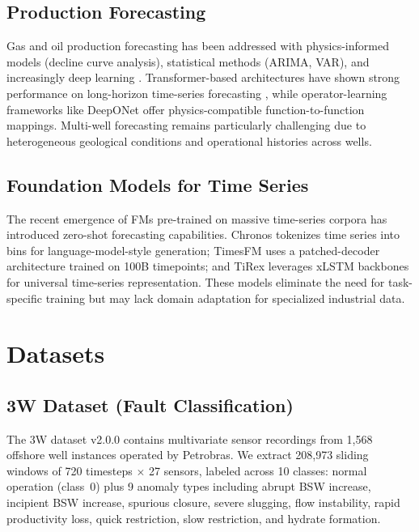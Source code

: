\documentclass[conference]{IEEEtran}
\begin{document}
\subsection{Production Forecasting}

Gas and oil production forecasting has been addressed with physics-informed models (decline curve analysis), statistical methods (ARIMA, VAR), and increasingly deep learning \cite{dl_forecasting}. Transformer-based architectures have shown strong performance on long-horizon time-series forecasting \cite{patchtst}, while operator-learning frameworks like DeepONet \cite{deeponet} offer physics-compatible function-to-function mappings. Multi-well forecasting remains particularly challenging due to heterogeneous geological conditions and operational histories across wells.

\subsection{Foundation Models for Time Series}

The recent emergence of FMs pre-trained on massive time-series corpora has introduced zero-shot forecasting capabilities. Chronos \cite{chronos} tokenizes time series into bins for language-model-style generation; TimesFM \cite{timesfm} uses a patched-decoder architecture trained on 100B timepoints; and TiRex \cite{tirex} leverages xLSTM backbones for universal time-series representation. These models eliminate the need for task-specific training but may lack domain adaptation for specialized industrial data.

\section{Datasets}
\label{sec:datasets}

\subsection{3W Dataset (Fault Classification)}

The 3W dataset v2.0.0 \cite{3w} contains multivariate sensor recordings from 1{,}568 offshore well instances operated by Petrobras. We extract 208{,}973 sliding windows of 720 timesteps $\times$ 27 sensors, labeled across 10 classes: normal operation (class~0) plus 9 anomaly types including abrupt BSW increase, incipient BSW increase, spurious closure, severe slugging, flow instability, rapid productivity loss, quick restriction, slow restriction, and hydrate formation.
\end{document}
